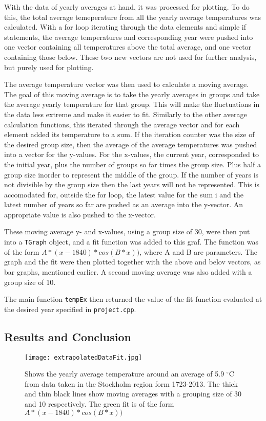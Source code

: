 With the data of yearly averages at hand, it was processed for plotting. To do this, the total average temeperature from all the yearly average temperatures was calculated. With a for loop iterating through the data elements and simple if statements, the average temperatures and corresponding year were pushed into one vector containing all temperatures above the total average, and one vector containing those below. These two new vectors are not used for further analysis, but purely used for plotting.

The average temperature vector was then used to calculate a moving average. The goal of this moving average is to take the yearly averages in groups and take the average yearly temperature for that group. This will make the fluctuations in the data less extreme and make it easier to fit. Similarly to the other average calculation functions, this iterated through the average vector and for each element added its temperature to a sum. If the iteration counter was the size of the desired group size, then the average of the average temperatures was pushed into a vector for the y-values. For the x-values, the current year, corresponded to the initial year, plus the number of groups so far times the group size. Plus half a group size inorder to represent the middle of the group. If the number of years is not divisible by the group size then the last years will not be represented. This is accomodated for, outside the for loop, the latest value for the sum i and the latest number of years so far are pushed as an average into the y-vector. An appropriate value is also pushed to the x-vector.

These moving average y- and x-values, using a group size of 30, were then put into a \texttt{TGraph} object, and a fit function was added to this graf. The function was of the form $A*(x-1840)*cos(B*x))$, where A and B are parameters. The graph and the fit were then plotted together with the above and belov vectors, as bar graphs, mentioned earlier. A second moving average was also added with a group size of 10.

The main function \texttt{tempEx} then returned the value of the fit function evaluated at the desired year specified in \texttt{project.cpp}.

\subsection{Results and Conclusion}

\begin{figure}[ht]
\begin{center}
\texttt{[image: extrapolatedDataFit.jpg]}
\caption{\label{fig:extrap1}Shows the yearly average temperature around an average of 5.9 $^{\circ}$C from data taken in the Stockholm region form 1723-2013. The thick and thin black lines show moving averages with a grouping size of 30 and 10 respectively. The green fit is of the form $A*(x-1840)*cos(B*x))$}
\end{center}
\end{figure}

